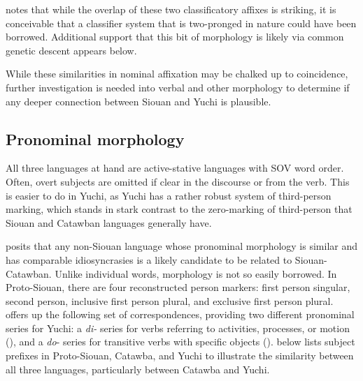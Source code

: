 \documentclass[output=paper]{LSP/langsci}
\begin{document}
\citet{Rankin1998scy} notes that while the overlap of these two classificatory affixes is striking, it is conceivable that a classifier system that is two-pronged in nature could have been borrowed. Additional support that this bit of morphology is likely via common genetic descent appears below.

While these similarities in nominal affixation may be chalked up to coincidence, further investigation is needed into verbal and other morphology to determine if any deeper connection between Siouan and Yuchi is plausible.

\subsection{Pronominal morphology}

All three languages at hand are active-stative languages with SOV word order. Often, overt subjects are omitted if clear in the discourse or from the verb. This is easier to do in Yuchi, as Yuchi has a rather robust system of third-person marking, which stands in stark contrast to the zero-marking of third-person that Siouan and Catawban languages generally have.

\citet{Rankin1996,Rankin1998scy} posits that any non-Siouan language whose pronominal morphology is similar and has comparable idiosyncrasies is a likely candidate to be related to Siouan-Catawban. Unlike individual words, morphology is not so easily borrowed. In Proto-Siouan, there are four reconstructed person markers: first person singular, second person, inclusive first person plural, and exclusive first person plural. \citet{Rankin1998scy} offers up the following set of correspondences, providing two different pronominal series for Yuchi: a \emph{di-} series for verbs referring to activities, processes, or motion (\citealt[130]{Linn2000}), and a \emph{do}- series for transitive verbs with specific objects (\citealt[178]{Linn2000}).  below lists subject prefixes in Proto-Siouan, Catawba, and Yuchi to illustrate the similarity between all three languages, particularly between Catawba and Yuchi.
\end{document}
